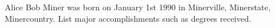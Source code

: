  
Alice Bob Miner was born on January 1st 1990 in Minerville, Minerstate, Minercountry. List major accomplishments such as degrees received.